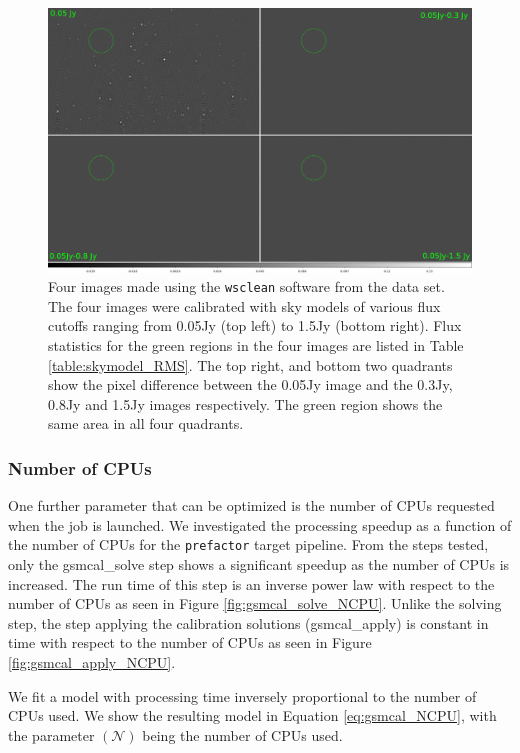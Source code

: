 \documentclass[preprint,5p]{elsarticle}
\begin{document}
\begin{figure}
    \includegraphics[width=0.95\linewidth]{figures/difference_4.png}
      \caption{Four images made using the \texttt{wsclean} software \citep{wsclean} from the data set\protect\footnotemark. The four images were calibrated with sky models of various flux cutoffs ranging from 0.05Jy (top left) to 1.5Jy (bottom right). Flux statistics for the green regions in the four images are listed in Table \ref{table:skymodel_RMS}. The top right, and bottom two quadrants show the pixel difference between the 0.05Jy image and the 0.3Jy, 0.8Jy and 1.5Jy images respectively. The green region shows the same area in all four quadrants.  }
	\label{fig:skymodel_images}
\end{figure}
\subsubsection{Number of CPUs}
One further parameter that can be optimized is the number of CPUs requested when the job is launched. We investigated the processing speedup as a function of the number of CPUs for the \texttt{prefactor} target pipeline. From the steps tested, only the {\selectfont gsmcal\_solve} step shows a significant speedup as the number of CPUs is increased. The run time of this step is an inverse power law with respect to the number of CPUs as seen in Figure \ref{fig:gsmcal_solve_NCPU}. Unlike the solving step, the step applying the calibration solutions ({\selectfont gsmcal\_apply}) is constant in time with respect to the number of CPUs as seen in Figure \ref{fig:gsmcal_apply_NCPU}. 

We fit a model with processing time inversely proportional to the number of CPUs used. We show the resulting model in Equation \ref{eq:gsmcal_NCPU}, with the parameter $(\mathcal{N})$ being the number of CPUs used. 
\end{document}
